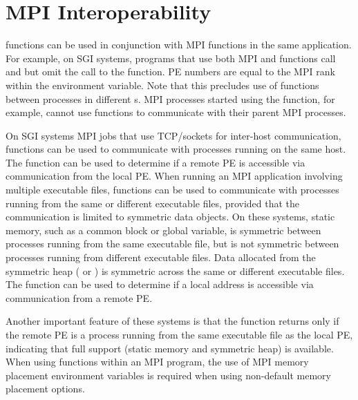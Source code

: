 \section{\ac{MPI} Interoperability}
\begin{sloppypar} %
\openshmem functions can be used in conjunction  with  \ac{MPI}
functions  in  the  same  application.   For example, on SGI systems, programs that use both \ac{MPI} and
\openshmem functions call  and  but omit the call
to  the  function.  \openshmem \ac{PE} numbers are equal to the \ac{MPI} rank
within the  environment variable.  Note  that  this  precludes 
use of \openshmem functions between processes in different s. 
\ac{MPI} processes started using the   function,  for
example,  cannot  use  \openshmem functions to communicate with their parent
\ac{MPI} processes.
\end{sloppypar}
On SGI systems \ac{MPI} jobs that use TCP/sockets for inter-host communication, \openshmem functions can be used to communicate with processes running on the same
 host.  The  function can be used to determine if a remote \ac{PE}
 is accessible via \openshmem communication from the local \ac{PE}. When  running  an  \ac{MPI} application involving multiple executable files, \openshmem functions can be used to communicate with processes running  from the same or different executable files, provided that the communication is limited to symmetric data objects.  On these systems, static  memory, such as a \Fortran{} common block or \Clang{} global variable, is symmetric between processes running from the same executable file,  but
 is  not  symmetric  between processes running from different executable
 files.  Data allocated from the symmetric heap (  or  )
 is  symmetric  across  the same or different executable files. The function 
  can be used to determine  if  a  local  address  is
 accessible via \openshmem communication from a remote \ac{PE}.

 Another important feature of these systems is that the   function returns  only if the remote \ac{PE} is a process running from the same  executable  file  as  the
 local PE, indicating that full \openshmem support (static memory and symmetric heap) is available. When using \openshmem functions within an \ac{MPI} program, the use of 
 \ac{MPI}  memory placement environment variables is required when using non-default memory 
 placement options.
